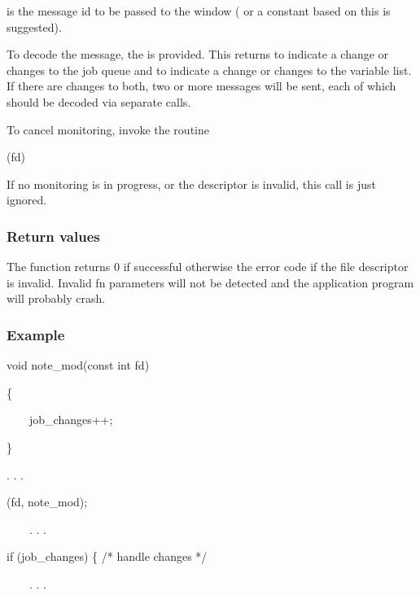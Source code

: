  is the message id to be passed to the window
( or a constant based on this is
suggested).

To decode the message, the \funcXBprocmon{} is
provided. This returns  to
indicate a change or changes to the job queue and
 to indicate a change or changes
to the variable list. If there are changes to both, two or more
messages will be sent, each of which should be decoded via separate
\funcXBprocmon{} calls.

To cancel monitoring, invoke the routine

\begin{expara}

\funcnameXBunsetmon{}(fd)

\end{expara}

If no monitoring is in progress, or the descriptor is invalid, this call
is just ignored.

\subsubsection{Return values}
The function \funcXBjobmon{} returns 0 if successful
otherwise the error code  if the
file descriptor is invalid. Invalid fn parameters will not be detected
and the application program will probably crash.

\subsubsection{Example}

\begin{expara}

void note\_mod(const int fd)

\{

\ \ \ \ job\_changes++;

\}

\bigskip


. . .

\bigskip


\funcnameXBjobmon{}(fd, note\_mod);

\ \ \ \ . . .

\bigskip


if (job\_changes) \{ /* handle changes */

\ \ \ \ . . .

\

\end{expara}

